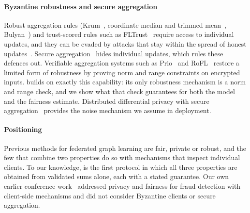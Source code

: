 \paragraph{Byzantine robustness and secure aggregation}
Robust aggregation rules (Krum~\citep{blanchard2017krum}, coordinate median and trimmed mean~\citep{yin2018byzantine}, Bulyan~\citep{mhamdi2018hidden}) and trust-scored rules such as FLTrust~\citep{cao2021fltrust} require access to individual updates, and they can be evaded by attacks that stay within the spread of honest updates~\citep{baruch2019little,xie2019fall}. Secure aggregation~\citep{bonawitz2017practical} hides individual updates, which rules these defences out. Verifiable aggregation systems such as Prio~\citep{corrigangibbs2017prio} and RoFL~\citep{lycklama2023rofl} restore a limited form of robustness by proving norm and range constraints on encrypted inputs. \clamp{} builds on exactly this capability: its only robustness mechanism is a norm and range check, and we show what that check guarantees for both the model and the fairness estimate. Distributed differential privacy with secure aggregation~\citep{kairouz2021distributed} provides the noise mechanism we assume in deployment.

\paragraph{Positioning}
Previous methods for federated graph learning are fair, private or robust, and the few that combine two properties do so with mechanisms that inspect individual clients. To our knowledge, \clamp{} is the first protocol in which all three properties are obtained from validated sums alone, each with a stated guarantee. Our own earlier conference work~\citep{dang2026fedfairgnn} addressed privacy and fairness for fraud detection with client-side mechanisms and did not consider Byzantine clients or secure aggregation.
